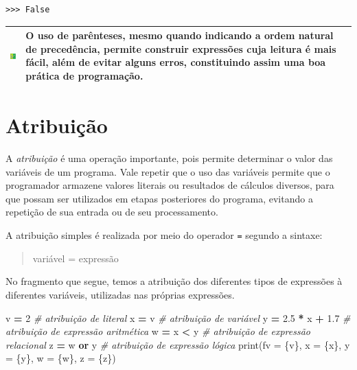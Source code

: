 \documentclass[
]{book}
\newenvironment{Shaded}{\begin{snugshade}}{\end{snugshade}}
\newcommand{\BuiltInTok}[1]{#1}
\newcommand{\CommentTok}[1]{\textcolor[rgb]{0.56,0.35,0.01}{\textit{#1}}}
\newcommand{\DecValTok}[1]{\textcolor[rgb]{0.00,0.00,0.81}{#1}}
\newcommand{\FloatTok}[1]{\textcolor[rgb]{0.00,0.00,0.81}{#1}}
\newcommand{\KeywordTok}[1]{\textcolor[rgb]{0.13,0.29,0.53}{\textbf{#1}}}
\newcommand{\NormalTok}[1]{#1}
\newcommand{\OperatorTok}[1]{\textcolor[rgb]{0.81,0.36,0.00}{\textbf{#1}}}
\newcommand{\SpecialCharTok}[1]{\textcolor[rgb]{0.00,0.00,0.00}{#1}}
\newcommand{\SpecialStringTok}[1]{\textcolor[rgb]{0.31,0.60,0.02}{#1}}
\begin{document}
\begin{verbatim}
>>> False
\end{verbatim}

\begin{longtable}[]{@{}
  >{\centering\arraybackslash}p{}
  >{\raggedright\arraybackslash}p{}@{}}
\toprule
\includegraphics{images/do.png} & O uso de parênteses, mesmo quando indicando a ordem natural de precedência, permite construir expressões cuja leitura é mais fácil, além de evitar alguns erros, constituindo assim uma boa prática de programação. \\
\midrule
\endhead
\bottomrule
\end{longtable}

\hypertarget{comput-atrib}{%
\section{Atribuição}\label{comput-atrib}}

A \emph{atribuição} é uma operação importante, pois permite determinar o valor das variáveis de um programa. Vale repetir que o uso das variáveis permite que o programador armazene valores literais ou resultados de cálculos diversos, para que possam ser utilizados em etapas posteriores do programa, evitando a repetição de sua entrada ou de seu processamento.

A atribuição simples é realizada por meio do operador \texttt{=} segundo a sintaxe:

\begin{quote}
variável = expressão
\end{quote}

No fragmento que segue, temos a atribuição dos diferentes tipos de expressões à diferentes variáveis, utilizadas nas próprias expressões.

\begin{Shaded}
\begin{Highlighting}[]
\NormalTok{v }\OperatorTok{=} \DecValTok{2} \CommentTok{\# atribuição de literal}
\NormalTok{x }\OperatorTok{=}\NormalTok{ v }\CommentTok{\# atribuição de variável}
\NormalTok{y }\OperatorTok{=} \FloatTok{2.5} \OperatorTok{*}\NormalTok{ x }\OperatorTok{+} \FloatTok{1.7} \CommentTok{\# atribuição de expressão aritmética}
\NormalTok{w }\OperatorTok{=}\NormalTok{ x }\OperatorTok{\textless{}}\NormalTok{ y }\CommentTok{\# atribuição de expressão relacional}
\NormalTok{z }\OperatorTok{=}\NormalTok{ w }\KeywordTok{or}\NormalTok{ y }\CommentTok{\# atribuição de expressão lógica}
\BuiltInTok{print}\NormalTok{(}\SpecialStringTok{f\textquotesingle{}v = }\SpecialCharTok{\{v\}}\SpecialStringTok{, x = }\SpecialCharTok{\{x\}}\SpecialStringTok{, y = }\SpecialCharTok{\{y\}}\SpecialStringTok{, w = }\SpecialCharTok{\{w\}}\SpecialStringTok{, z = }\SpecialCharTok{\{z\}}\SpecialStringTok{\textquotesingle{}}\NormalTok{)}
\end{Highlighting}
\end{Shaded}
\end{document}
